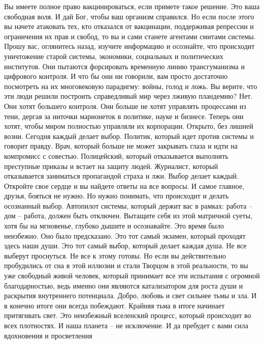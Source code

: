 Вы имеете полное право вакцинироваться, если примете такое решение. Это ваша свободная воля. И дай Бог, чтобы ваш организм справился. Но если после этого вы начете атаковать тех, кто отказался от вакцинации, поддерживая репрессии и ограничения их прав и свобод, то вы и сами станете агентами смитами системы. 
Прошу вас, оглянитесь назад, изучите информацию и осознайте, что происходит уничтожение старой системы, экономики, социальных и политических институтов. Они пытаются форсировать временную линию трансгуманизма и цифрового контроля. И что бы они ни говорили, вам просто достаточно посмотреть на их многовековую парадигму: войны, голод и ложь. Вы верите, что эти люди решили построить справедливый мир через лживую пландемию? Нет. Они хотят большего контроля. Они больше не хотят управлять процессами из тени, дергая за ниточки марионеток в политике, науке и бизнесе. Теперь они хотят, чтобы миром полностью управляли их корпорации. Открыто, без лишней возни.
Сегодня каждый делает выбор. Политик, который идет против системы и говорит правду. Врач, который больше не может закрывать глаза и идти на компромисс с совестью. Полицейский, который отказывается выполнять преступные приказы и встает на защиту людей. Журналист, который отказывается заниматься пропагандой страха и лжи. Выбор делает каждый. Откройте свое сердце и вы найдете ответы на все вопросы.
И самое главное, друзья, бояться не нужно. Но нужно понимать, что происходит и делать осознанный выбор. Автопилот системы, который держит вас в рамках: работа – дом – работа, должен быть отключен. Вытащите себя из этой матричной суеты, хотя бы на мгновенье, глубоко дышите и осознавайте. Это время было неизбежно. Оно было предсказано. Это тот самый экзамен, который проходят здесь наши души. Это тот самый выбор, который делает каждая душа. 
Не все выберут проснуться. Не все к этому готовы. Но если вы действительно пробудились от сна в этой иллюзии и стали Творцом в этой реальности, то вы уже свободный живой человек, который принимает все эти испытания с огромной благодарностью, ведь именно они являются катализатором для роста души и раскрытия внутреннего потенциала.
Добро, любовь и свет сильнее тьмы и зла. И в конечно итоге они всегда побеждают. Крайняя тьма в итоге начинает притягивать свет. Это неизбежный вселенский процесс, который происходит во всех плотностях. И наша планета – не исключение. И да пребудет с вами сила вдохновения и просветления 
